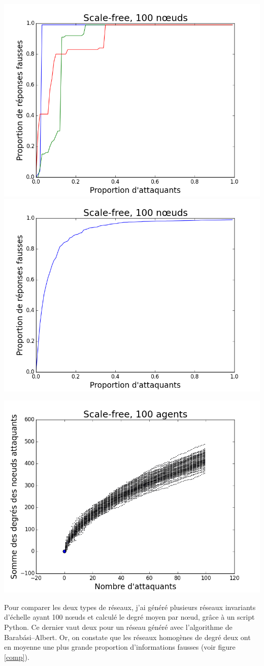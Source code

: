 \documentclass[12pt,a4paper]{article}
\begin{document}
\begin{center}
\includegraphics[width=0.49\linewidth]{../resultats/scale-free/sf-t1s-n100-2-it3.png}
\includegraphics[width=0.49\linewidth]{../resultats/scale-free/sf-t1-n100-1-it100.png}
 \label{sf}
\end{center}

\begin{center}
\includegraphics[width=0.49\linewidth]{../resultats/scale-free/sf-t2-n-100-1-it100.png}
 \label{deg}
\end{center}

Pour comparer les deux types de réseaux, j'ai généré plusieurs réseaux invariants d'échelle ayant 100 nœuds et calculé le degré moyen par nœud, grâce à un script Python.
Ce dernier vaut deux pour un réseau généré avec l'algorithme de Barabási–Albert.
Or, on constate que les réseaux homogènes de degré deux ont en moyenne une plus grande proportion d'informations fausses (voir figure \ref{comp}).
\end{document}

